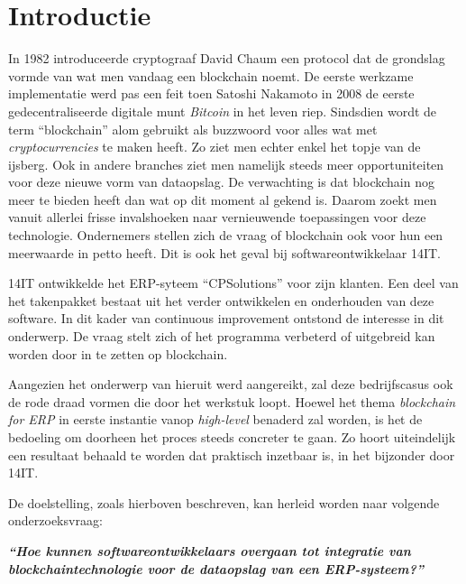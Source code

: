 
\section{Introductie} %
\label{sec:introductie}

In 1982 introduceerde cryptograaf David Chaum een protocol dat de grondslag vormde van wat men vandaag een blockchain noemt. De eerste werkzame implementatie werd pas een feit toen Satoshi Nakamoto in 2008 de eerste gedecentraliseerde digitale munt \textit{Bitcoin} in het leven riep. Sindsdien wordt de term ``blockchain'' alom gebruikt als buzzwoord voor alles wat met \textit{cryptocurrencies} te maken heeft. Zo ziet men echter enkel het topje van de ijsberg. Ook in andere branches ziet men namelijk steeds meer opportuniteiten voor deze nieuwe vorm van dataopslag. De verwachting is dat blockchain nog meer te bieden heeft dan wat op dit moment al gekend is. Daarom zoekt men vanuit allerlei frisse invalshoeken naar vernieuwende toepassingen voor deze technologie. Ondernemers stellen zich de vraag of blockchain ook voor hun een meerwaarde in petto heeft. Dit is ook het geval bij softwareontwikkelaar 14IT.

14IT ontwikkelde het ERP-syteem ``CPSolutions'' voor zijn klanten. Een deel van het takenpakket bestaat uit het verder ontwikkelen en onderhouden van deze software. In dit kader van continuous improvement ontstond de interesse in dit onderwerp. De vraag stelt zich of het programma verbeterd of uitgebreid kan worden door in te zetten op blockchain.

Aangezien het onderwerp van hieruit werd aangereikt, zal deze bedrijfscasus ook de rode draad vormen die door het werkstuk loopt. Hoewel het thema \textit{blockchain for ERP} in eerste instantie vanop \textit{high-level} benaderd zal worden, is het de bedoeling om doorheen het proces steeds concreter te gaan. Zo hoort uiteindelijk een resultaat behaald te worden dat praktisch inzetbaar is, in het bijzonder door 14IT.


De doelstelling, zoals hierboven beschreven, kan herleid worden naar volgende onderzoeksvraag:

\begin{center}
	\textit{\textbf{``Hoe kunnen softwareontwikkelaars overgaan tot integratie van blockchaintechnologie voor de dataopslag van een ERP-systeem?''}}
\end{center}


